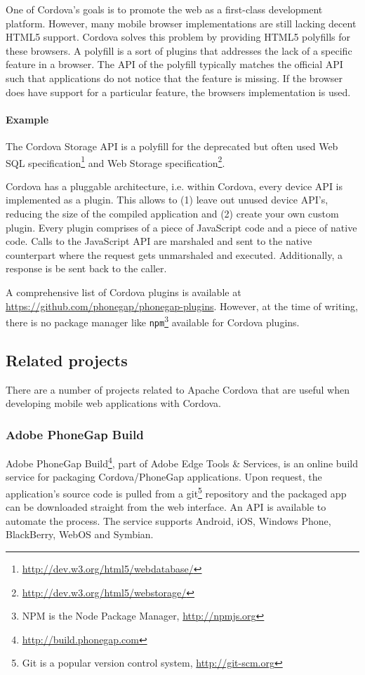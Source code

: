 One of Cordova's goals is to promote the web as a first-class development platform. However, many mobile browser implementations are still lacking decent HTML5 support. Cordova solves this problem by providing HTML5 polyfills for these browsers. A polyfill is a sort of plugins that addresses the lack of a specific feature in a browser. The API of the polyfill typically matches the official API such that applications do not notice that the feature is missing. If the browser does have support for a particular feature, the browsers implementation is used. 

\paragraph{Example} The Cordova Storage API is a polyfill for the deprecated but often used Web SQL specification\footnote{\url{http://dev.w3.org/html5/webdatabase/}} and Web Storage specification\footnote{\url{http://dev.w3.org/html5/webstorage/}}. 

Cordova has a pluggable architecture, i.e. within Cordova, every device API is implemented as a plugin. This allows to (1) leave out unused device API's, reducing the size of the compiled application and (2) create your own custom plugin. Every plugin comprises of a piece of JavaScript code and a piece of native code. Calls to the JavaScript API are marshaled and sent to the native counterpart where the request gets unmarshaled and executed. Additionally, a response is be sent back to the caller.

A comprehensive list of Cordova plugins is available at \url{https://github.com/phonegap/phonegap-plugins}. However, at the time of writing, there is no package manager like \texttt{npm}\footnote{NPM is the Node Package Manager, \url{http://npmjs.org}} available for Cordova plugins.

\subsection{Related projects}

There are a number of projects related to Apache Cordova that are useful when developing mobile web applications with Cordova.

\subsubsection{Adobe PhoneGap Build}

Adobe PhoneGap Build\footnote{\url{http://build.phonegap.com}}, part of Adobe Edge Tools \& Services, is an online build service for packaging Cordova/PhoneGap applications. Upon request, the application's source code is pulled from a git\footnote{Git is a popular version control system, \url{http://git-scm.org}} repository and the packaged app can be downloaded straight from the web interface. An API is available to automate the process. The service supports Android, iOS, Windows Phone, BlackBerry, WebOS and Symbian.

